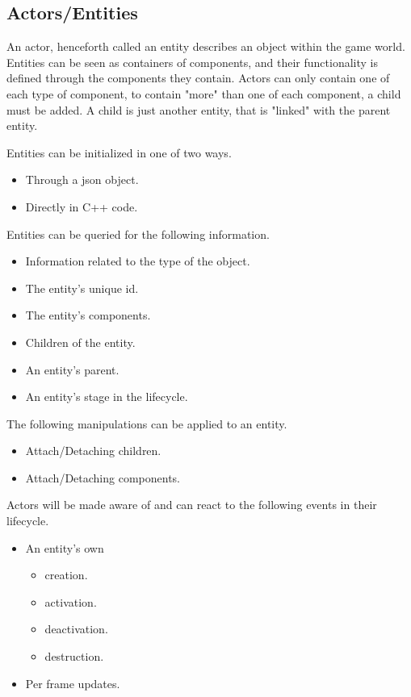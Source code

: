 \subsection{Actors/Entities}
An actor, henceforth called an entity describes an object within the game world. 
Entities can be seen as containers of components, 
and their functionality is defined through the components they contain.
Actors can only contain one of each type of component, to contain "more" than one of each component, a child must be added. 
A child is just another entity, that is "linked" with the parent entity.

Entities can be initialized in one of two ways.
\begin{itemize}
    \item
    Through a json object.

    \item
    Directly in C++ code.
\end{itemize}

Entities can be queried for the following information.
\begin{itemize}
    \item
    Information related to the type of the object.

    \item
    The entity's unique id.

    \item
    The entity's components.

    \item
    Children of the entity.

    \item
    An entity's parent.

    \item
    An entity's stage in the lifecycle.
\end{itemize}

The following manipulations can be applied to an entity.
\begin{itemize}
    \item 
    Attach/Detaching children.

    \item
    Attach/Detaching components.
\end{itemize}

Actors will be made aware of and can react to the following events in their lifecycle.
\begin{itemize}
    \item
    An entity's own
    \begin{itemize}
        \item creation.
        \item activation.
        \item deactivation.
        \item destruction.
    \end{itemize}

    \item
    Per frame updates.
\end{itemize}
